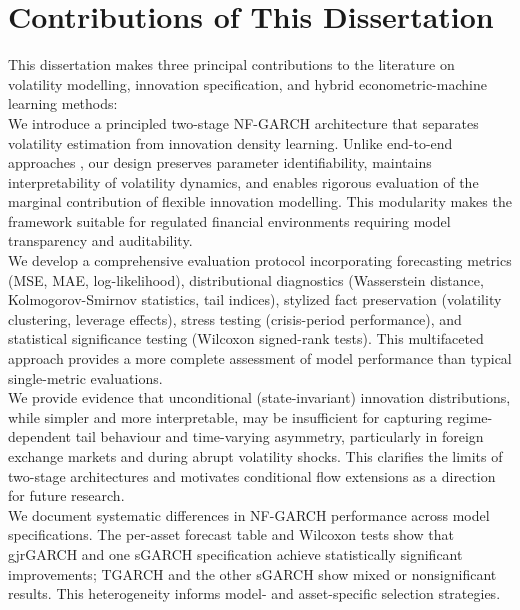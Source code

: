 \documentclass[oneside,12pt]{CUEDthesisPSnPDF}
\newcommand{\parencite}{\citep}
\begin{document}

\section{Contributions of This Dissertation}
\label{sec:contributions}

\noindent
This dissertation makes three principal contributions to the literature on volatility modelling, innovation specification, and hybrid econometric-machine learning methods:\\

We introduce a principled two-stage NF-GARCH architecture that separates volatility estimation from innovation density learning. Unlike end-to-end approaches \parencite{seitz2022garchnf}, our design preserves parameter identifiability, maintains interpretability of volatility dynamics, and enables rigorous evaluation of the marginal contribution of flexible innovation modelling. This modularity makes the framework suitable for regulated financial environments requiring model transparency and auditability.\\
    
We develop a comprehensive evaluation protocol incorporating forecasting metrics (MSE, MAE, log-likelihood), distributional diagnostics (Wasserstein distance, Kolmogorov-Smirnov statistics, tail indices), stylized fact preservation (volatility clustering, leverage effects), stress testing (crisis-period performance), and statistical significance testing (Wilcoxon signed-rank tests). This multifaceted approach provides a more complete assessment of model performance than typical single-metric evaluations.\\
    
We provide evidence that unconditional (state-invariant) innovation distributions, while simpler and more interpretable, may be insufficient for capturing regime-dependent tail behaviour and time-varying asymmetry, particularly in foreign exchange markets and during abrupt volatility shocks. This clarifies the limits of two-stage architectures and motivates conditional flow extensions as a direction for future research.\\

We document systematic differences in NF-GARCH performance across model specifications. The per-asset forecast table and Wilcoxon tests show that gjrGARCH and one sGARCH specification achieve statistically significant improvements; TGARCH and the other sGARCH show mixed or nonsignificant results. This heterogeneity informs model- and asset-specific selection strategies.\\
    
\end{document}
